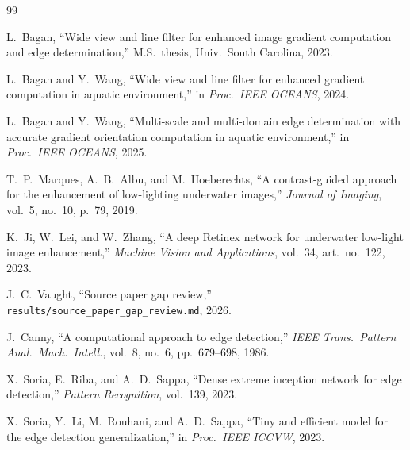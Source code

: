 \documentclass[conference]{IEEEtran}
\begin{document}
\begin{thebibliography}{99}

L.~Bagan, ``Wide view and line filter for enhanced image gradient computation and edge determination,'' M.S.\ thesis, Univ.\ South Carolina, 2023.

L.~Bagan and Y.~Wang, ``Wide view and line filter for enhanced gradient computation in aquatic environment,'' in \textit{Proc.\ IEEE OCEANS}, 2024.

L.~Bagan and Y.~Wang, ``Multi-scale and multi-domain edge determination with accurate gradient orientation computation in aquatic environment,'' in \textit{Proc.\ IEEE OCEANS}, 2025.

T.~P.~Marques, A.~B.~Albu, and M.~Hoeberechts, ``A contrast-guided approach for the enhancement of low-lighting underwater images,'' \textit{Journal of Imaging}, vol.~5, no.~10, p.~79, 2019.

K.~Ji, W.~Lei, and W.~Zhang, ``A deep Retinex network for underwater low-light image enhancement,'' \textit{Machine Vision and Applications}, vol.~34, art.\ no.~122, 2023.

J.~C.~Vaught, ``Source paper gap review,'' \texttt{results/source\_paper\_gap\_review.md}, 2026.

J.~Canny, ``A computational approach to edge detection,'' \textit{IEEE Trans.\ Pattern Anal.\ Mach.\ Intell.}, vol.~8, no.~6, pp.~679--698, 1986.

X.~Soria, E.~Riba, and A.~D.~Sappa, ``Dense extreme inception network for edge detection,'' \textit{Pattern Recognition}, vol.~139, 2023.

X.~Soria, Y.~Li, M.~Rouhani, and A.~D.~Sappa, ``Tiny and efficient model for the edge detection generalization,'' in \textit{Proc.\ IEEE ICCVW}, 2023.

\end{thebibliography}
\end{document}
